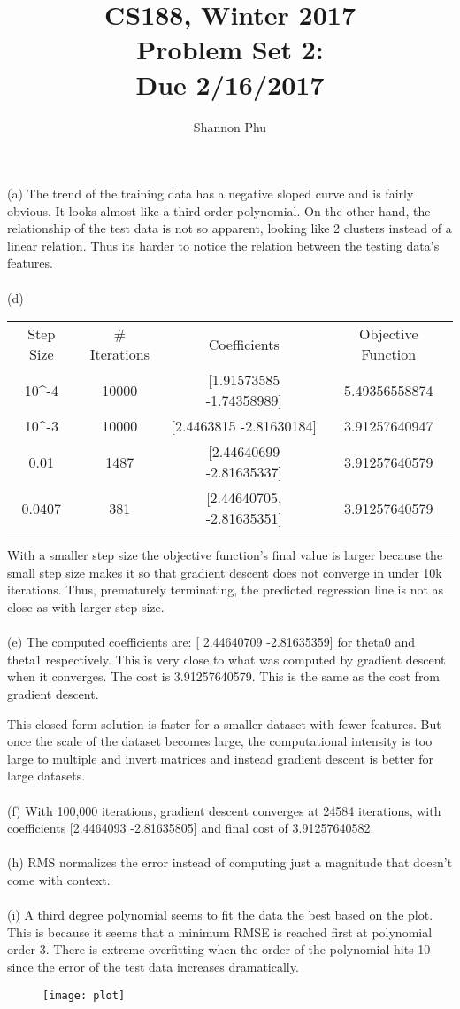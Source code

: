 \documentclass[11pt]{article}
\newcommand{\cnum}{CS188}
\newcommand{\ced}{Winter 2017}
\newcommand{\ctitle}[3]{\title{\vspace{-0.5in}\cnum, \ced\\Problem Set #1: #2\\Due #3}}
\begin{document}
\ctitle{2}{}{2/16/2017}
\author{Shannon Phu}
\date{}
\maketitle
\vspace{-0.3in}


(a) 
The trend of the training data has a negative sloped curve and is fairly obvious. It looks almost like a third order polynomial. On the other hand, the relationship of the test data is not so apparent, looking like 2 clusters instead of a linear relation. Thus its harder to notice the relation between the testing data's features.
\\
\\
(d)
\begin{center}
\begin{tabular}{ c c c c }
Step Size & # Iterations & Coefficients & Objective Function \\ 
10^-4 & 10000 & [1.91573585 -1.74358989] & 5.49356558874 \\ 
10^-3 & 10000 & [2.4463815  -2.81630184] & 3.91257640947 \\ 
0.01 & 1487 & [2.44640699 -2.81635337] & 3.91257640579 \\
0.0407 & 381 & [2.44640705, -2.81635351] & 3.91257640579
\end{tabular}
\end{center}

With a smaller step size the objective function's final value is larger because the small step size makes it so that gradient descent does not converge in under 10k iterations. Thus, prematurely terminating, the predicted regression line is not as close as with larger step size.
\\
\\
(e)
The computed coefficients are:
[ 2.44640709 -2.81635359]
for theta0 and theta1 respectively.
This is very close to what was computed by gradient descent when it converges.
The cost is 3.91257640579. This is the same as the cost from gradient descent.

This closed form solution is faster for a smaller dataset with fewer features. But once the scale of the dataset becomes large, the computational intensity is too large to multiple and invert matrices and instead gradient descent is better for large datasets.
\\
\\
(f)
With 100,000 iterations, gradient descent converges at 24584 iterations, with coefficients [2.4464093  -2.81635805] and final cost of 3.91257640582.
\\
\\
(h)
RMS normalizes the error instead of computing just a magnitude that doesn't come with context.
\\
\\
(i)
A third degree polynomial seems to fit the data the best based on the plot. This is because it seems that a minimum RMSE is reached first at polynomial order 3. There is extreme overfitting when the order of the polynomial hits 10 since the error of the test data increases dramatically.

\begin{figure}[h]
\centering
\texttt{[image: plot]}
\end{figure}
\end{document}
